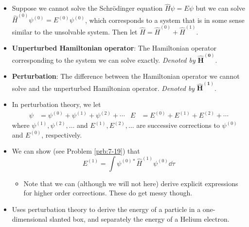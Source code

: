 \documentclass[../notes.tex]{subfiles}
\begin{document}
\begin{itemize}
    \item Suppose we cannot solve the Schr\"{o}dinger equation $\hat{H}\psi=E\psi$ but we can solve $\hat{H}^{(0)}\psi^{(0)}=E^{(0)}\psi^{(0)}$, which corresponds to a system that is in some sense similar to the unsolvable system. Then let $\hat{H}=\hat{H}^{(0)}+\hat{H}^{(1)}$.
    \item \textbf{Unperturbed Hamiltonian operator}: The Hamiltonian operator corresponding to the system we can solve exactly. \emph{Denoted by} $\bm{\hat{H}^{(0)}}$.
    \item \textbf{Perturbation}: The difference between the Hamiltonian operator we cannot solve and the unperturbed Hamiltonian operator. \emph{Denoted by} $\bm{\hat{H}^{(1)}}$.
    \item In perturbation theory, we let
    \begin{align*}
        \psi &= \psi^{(0)}+\psi^{(1)}+\psi^{(2)}+\cdots&
        E &= E^{(0)}+E^{(1)}+E^{(2)}+\cdots
    \end{align*}
    where $\psi^{(1)},\psi^{(2)},\dots$ and $E^{(1)},E^{(2)},\dots$ are successive corrections to $\psi^{(0)}$ and $E^{(0)}$, respectively.
    \item We can show (see Problem \ref{prb:7-19}) that
    \begin{equation*}
        E^{(1)} = \int\psi^{(0)*}\hat{H}^{(1)}\psi^{(0)}\dd{\tau}
    \end{equation*}
    \begin{itemize}
        \item Note that we can (although we will not here) derive explicit expressions for higher order corrections. These do get messy though.
    \end{itemize}
    \item Uses perturbation theory to derive the energy of a particle in a one-dimensional slanted box, and separately the energy of a Helium electron.
\end{itemize}
\end{document}
